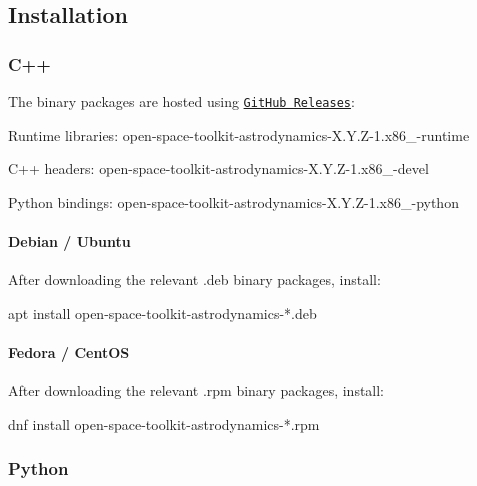 \subsection*{Installation}

\subsubsection*{C++}

The binary packages are hosted using \href{https://github.com/open-space-collective/open-space-toolkit-astrodynamics/releases}{\tt Git\+Hub Releases}\+:


\begin{DoxyItemize}
\item Runtime libraries\+: {\ttfamily open-\/space-\/toolkit-\/astrodynamics-\/\+X.\+Y.\+Z-\/1.\+x86\+\_-\/runtime}
\item C++ headers\+: {\ttfamily open-\/space-\/toolkit-\/astrodynamics-\/\+X.\+Y.\+Z-\/1.\+x86\+\_-\/devel}
\item Python bindings\+: {\ttfamily open-\/space-\/toolkit-\/astrodynamics-\/\+X.\+Y.\+Z-\/1.\+x86\+\_-\/python}
\end{DoxyItemize}

\paragraph*{Debian / Ubuntu}

After downloading the relevant {\ttfamily .deb} binary packages, install\+:


\begin{DoxyCode}
apt install open-space-toolkit-astrodynamics-*.deb
\end{DoxyCode}


\paragraph*{Fedora / Cent\+OS}

After downloading the relevant {\ttfamily .rpm} binary packages, install\+:


\begin{DoxyCode}
dnf install open-space-toolkit-astrodynamics-*.rpm
\end{DoxyCode}


\subsubsection*{Python}


